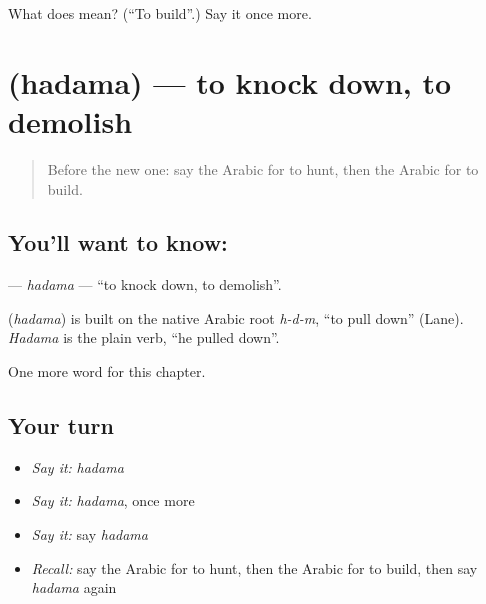 \begin{tcolorbox}[breakable,colback=teal!4,colframe=teal!35!black,title={Before you move on}]
What does  mean? (\textquotedblleft{}To build\textquotedblright{}.) Say it once more.
\end{tcolorbox}
\section[\texorpdfstring{\ar{هدم} (hadama)}{هدم (hadama)}]{ (hadama) — to knock down, to demolish}

\label{lesson:AR-C166-hadama}



\begin{quote}
Before the new one: say the Arabic for to hunt, then the Arabic for to build.
\end{quote}

\subsection*{You'll want to know: }
\textbf{} — \emph{hadama} — \textquotedblleft{}to knock down, to demolish\textquotedblright{}.

\begin{cousinweb}
\textbf{} (\emph{hadama}) is built on the native Arabic root \emph{h-d-m}, \textquotedblleft{}to pull down\textquotedblright{} (Lane). \emph{Hadama} is the plain verb, \textquotedblleft{}he pulled down\textquotedblright{}.
\end{cousinweb}

\begin{grammarlens}[title={What you've built}]
One more word for this chapter.
\end{grammarlens}

\subsection*{Your turn}
\begin{itemize}
\raggedright
  \item \emph{Say it:} \emph{hadama}
  \item \emph{Say it:} \emph{hadama}, once more
  \item \emph{Say it:} say \emph{hadama}
  \item \emph{Recall:} say the Arabic for to hunt, then the Arabic for to build, then say \emph{hadama} again
\end{itemize}

